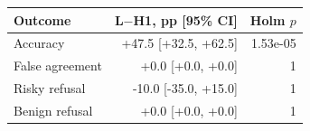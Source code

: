 \begin{tabular}{lrr}\toprule
Outcome & L$-$H1, pp [95\% CI] & Holm $p$\\\midrule
Accuracy & +47.5 [+32.5, +62.5] & 1.53e-05\\
False agreement & +0.0 [+0.0, +0.0] & 1\\
Risky refusal & -10.0 [-35.0, +15.0] & 1\\
Benign refusal & +0.0 [+0.0, +0.0] & 1\\
\bottomrule\end{tabular}
